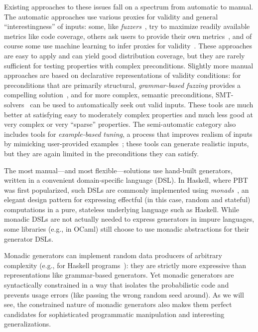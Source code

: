 Existing approaches to these issues
fall on a spectrum from automatic to manual. The automatic approaches use
various proxies for validity and general ``interestingness'' of
inputs: some, like {\em
fuzzers}~\cite{afl-readme}, try to maximize readily available metrics like code
coverage, others ask users to provide their own metrics~\cite{loscher2017targetedpbt}, and
of course some use machine learning to infer proxies for
validity~\cite{godefroid2017learn, DBLP:conf/icse/ReddyLPS20}. These approaches
are easy to apply and can yield good distribution coverage, but they are rarely
sufficient for testing properties with complex preconditions. Slightly more
manual approaches are based on declarative representations of validity
conditions: for preconditions that are primarily structural, {\em grammar-based
fuzzing} provides a compelling solution~\cite{godefroid2008grammar,
holler2012fuzzing, veggalam2016ifuzzer, wang2019superion,
srivastava2021gramatron}, and for more complex, semantic preconditions,
SMT-solvers~\cite{dewey2017automated, LuckPOPL,
steinhofel2022input} can be used to automatically seek out valid
inputs. These tools are
much better at satisfying easy to moderately complex properties and
much less good at very complex or very ``sparse'' properties. The semi-automatic
category also includes tools for {\em example-based tuning}, a process that
improves realism of inputs by mimicking user-provided
examples~\cite{soremekun2020inputs}; these tools can generate
realistic inputs, but they are again limited in the preconditions they can
satisfy.

The most manual---and most flexible---solutions use hand-built
generators, written in a convenient domain-specific language (DSL).
In  Haskell, where PBT was
first popularized, such DSLs are commonly implemented using {\em
monads\/}~\cite{moggi1991notions}, an elegant design pattern for
expressing effectful (in this case, random and stateful) computations
in a pure, stateless underlying
language such as Haskell. While monadic DSLs are not actually
needed to express generators in
impure languages, some libraries (e.g., in OCaml) still choose to use monadic
abstractions for their generator DSLs.

Monadic generators can implement random data producers of arbitrary complexity
(e.g., for Haskell
programs~\cite{palka_testing_2011}): they are strictly more expressive than
representations like grammar-based generators.  Yet monadic generators are
syntactically constrained in a way that isolates the probabilistic code and
prevents usage errors (like passing the wrong random seed around). As we will
see, the constrained nature of monadic generators also makes them perfect
candidates for sophisticated programmatic manipulation and interesting
generalizations.

